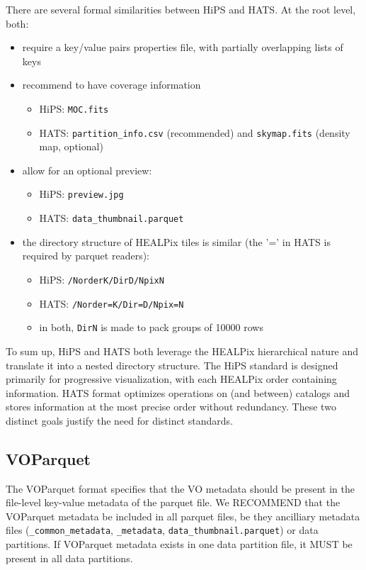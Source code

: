 \documentclass[11pt,a4paper]{ivoa}
\begin{document}
There are several formal similarities between HiPS and HATS.
At the root level, both:
\begin{itemize}
 \item require a key/value pairs properties file, with partially overlapping lists of keys
 \item recommend to have coverage information
 \begin{itemize}
  \item HiPS: \texttt{MOC.fits}
  \item HATS: \texttt{partition\_info.csv} (recommended) and \texttt{skymap.fits} (density map, optional)
 \end{itemize}
 \item allow for an optional preview:
 \begin{itemize}
  \item HiPS: \texttt{preview.jpg}
  \item HATS: \texttt{data\_thumbnail.parquet}
 \end{itemize}
 \item the directory structure of HEALPix tiles is similar (the '=' in HATS is required by parquet readers):
 \begin{itemize}
  \item HiPS: \texttt{/NorderK/DirD/NpixN}
  \item HATS: \texttt{/Norder=K/Dir=D/Npix=N}
  \item in both, \texttt{DirN} is made to pack groups of 10000 rows
 \end{itemize}
\end{itemize}
 
To sum up, HiPS and HATS both leverage the HEALPix hierarchical nature and translate it into a nested directory structure.
The HiPS standard is designed primarily for progressive visualization, with each HEALPix order containing information. 
HATS format optimizes operations on (and between) catalogs and stores information at the most precise order without redundancy.
These two distinct goals justify the need for distinct standards.

\subsection{VOParquet}

The VOParquet format \citep{IVOAPARQUET} specifies that the VO metadata should be present in the file-level key-value metadata of the parquet file.
We RECOMMEND that the VOParquet metadata be included in all parquet files, be they ancilliary metadata files (\texttt{\_common\_metadata}, \texttt{\_metadata}, \texttt{data\_thumbnail.parquet}) or data partitions.
If VOParquet metadata exists in one data partition file, it MUST be present in all data partitions.
\end{document}
